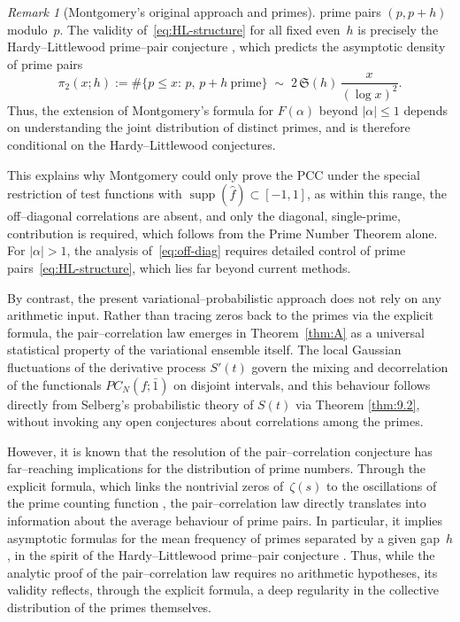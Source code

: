\documentclass[12pt,reqno]{amsart}
\theoremstyle{plain}
\theoremstyle{definition}
\theoremstyle{remark}
\newtheorem{rem}{Remark}[section]       %
\begin{document}
\begin{rem}[Montgomery's original approach and primes]
prime pairs $(p,p+h)$ modulo~$p$.
The validity of~\eqref{eq:HL-structure} for all fixed even~$h$
is precisely the Hardy--Littlewood prime--pair conjecture
\cite{HardyLittlewood1923},
which predicts the asymptotic density of prime pairs
\begin{equation}
\pi_2(x;h)
:= \#\{p\le x:\, p,\,p+h\ \text{prime}\}
\;\sim\;
2\,\mathfrak{S}(h)\,\frac{x}{(\log x)^2}.
\end{equation}
Thus, the extension of Montgomery’s formula for $F(\alpha)$ beyond $|\alpha|\le1$
depends on understanding the joint distribution of distinct primes,
and is therefore conditional on the Hardy--Littlewood conjectures.

This explains why Montgomery could only  prove the PCC under the special restriction of test functions with $\operatorname{supp}(\widehat{f})\subset[-1,1]$, as
within this range, the off--diagonal correlations are absent,
and only the diagonal, single-prime, contribution is required,
which follows from the Prime Number Theorem alone.
For $|\alpha|>1$, the analysis of~\eqref{eq:off-diag}
requires detailed control of prime pairs~\eqref{eq:HL-structure},
which lies far beyond current methods.


By contrast, the present variational--probabilistic approach 
does not rely on any arithmetic input.
Rather than tracing zeros back to the primes via the explicit formula,
the pair--correlation law emerges in Theorem~\ref{thm:A} 
as a universal statistical property of the variational ensemble itself.
The local Gaussian fluctuations of the derivative process \(S'(t)\)
govern the mixing and decorrelation of the functionals \(PC_N(f;\bar 1)\)
on disjoint intervals, and this behaviour follows directly from Selberg's 
probabilistic theory of \(S(t)\) via Theorem \ref{thm:9.2}, without invoking any open conjectures 
about correlations among the primes.

However, it is known that the resolution of the pair--correlation conjecture
has far--reaching implications for the distribution of prime numbers.
Through the explicit formula, which links the nontrivial zeros of~$\zeta(s)$
to the oscillations of the prime counting function
\cite{E,M},
the pair--correlation law directly translates into information about
the average behaviour of prime pairs.
In particular, it implies asymptotic formulas for the mean frequency
of primes separated by a given gap~$h$, in the spirit of the
Hardy--Littlewood prime--pair conjecture
\cite{HardyLittlewood1923,GoldstonMontgomery1987}.
Thus, while the analytic proof of the pair--correlation law
requires no arithmetic hypotheses, its validity reflects,
through the explicit formula, a deep regularity in the collective
distribution of the primes themselves.


\end{rem}
\end{document}
